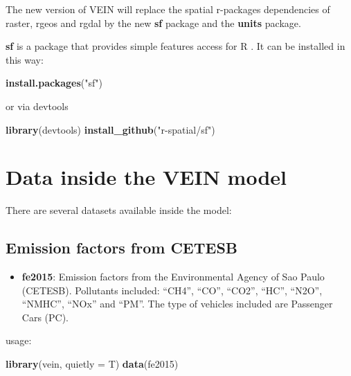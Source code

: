\documentclass[12pt,graybox,envcountchap,sectrefs]{krantz}
\makeatletter
\newenvironment{Shaded}{\begin{snugshade}}{\end{snugshade}}
\newcommand{\KeywordTok}[1]{\textcolor[rgb]{0.13,0.29,0.53}{\textbf{#1}}}
\newcommand{\DataTypeTok}[1]{\textcolor[rgb]{0.13,0.29,0.53}{#1}}
\newcommand{\StringTok}[1]{\textcolor[rgb]{0.31,0.60,0.02}{#1}}
\newcommand{\NormalTok}[1]{#1}
\providecommand{\tightlist}{%
  \setlength{\itemsep}{0pt}\setlength{\parskip}{0pt}}
\newenvironment{kframe}{%
\medskip{}
\setlength{\fboxsep}{.8em}
 \def\at@end@of@kframe{}%
 \ifinner\ifhmode%
  \def\at@end@of@kframe{\end{minipage}}%
  \begin{minipage}{\columnwidth}%
 \fi\fi%
 \def\FrameCommand##1{\hskip\@totalleftmargin \hskip-\fboxsep
 \colorbox{shadecolor}{##1}\hskip-\fboxsep
     \hskip-\linewidth \hskip-\@totalleftmargin \hskip\columnwidth}%
 \MakeFramed {\advance\hsize-\width
   \@totalleftmargin\z@ \linewidth\hsize
   \@setminipage}}%
 {\par\unskip\endMakeFramed%
 \at@end@of@kframe}
\renewenvironment{Shaded}{\begin{kframe}}{\end{kframe}}
\theoremstyle{definition}
\theoremstyle{definition}
\theoremstyle{definition}
\theoremstyle{remark}
\makeatother
\begin{document}
The new version of VEIN will replace the spatial r-packages dependencies
of raster, rgeos and rgdal by the new \textbf{sf} \citep{sf} package and
the \textbf{units} \citep{units} package.

\textbf{sf} is a package that provides simple features access for R
\citep{sf}. It can be installed in this way:

\begin{Shaded}
\begin{Highlighting}[]
\KeywordTok{install.packages}\NormalTok{(}\StringTok{"sf"}\NormalTok{)}
\end{Highlighting}
\end{Shaded}

or via devtools

\begin{Shaded}
\begin{Highlighting}[]
\KeywordTok{library}\NormalTok{(devtools)}
\KeywordTok{install_github}\NormalTok{(}\StringTok{"r-spatial/sf"}\NormalTok{)}
\end{Highlighting}
\end{Shaded}

\section{Data inside the VEIN model}\label{data-inside-the-vein-model}

There are several datasets available inside the model:

\subsection{Emission factors from
CETESB}\label{emission-factors-from-cetesb}

\begin{itemize}
\tightlist
\item
  \textbf{fe2015}: Emission factors from the Environmental Agency of Sao
  Paulo (CETESB). Pollutants included: ``CH4'', ``CO'', ``CO2'', ``HC'',
  ``N2O'', ``NMHC'', ``NOx'' and ``PM''. The type of vehicles included
  are Passenger Cars (PC).
\end{itemize}

usage:

\begin{Shaded}
\begin{Highlighting}[]
\KeywordTok{library}\NormalTok{(vein, }\DataTypeTok{quietly =}\NormalTok{ T)}
\KeywordTok{data}\NormalTok{(fe2015)}
\end{Highlighting}
\end{Shaded}
\end{document}

